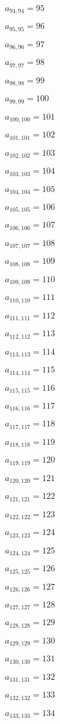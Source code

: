 \documentclass[a4paper,12pt]{article}
\begin{document}
$a _{ 94, 94 } = 95$

$a _{ 95, 95 } = 96$

$a _{ 96, 96 } = 97$

$a _{ 97, 97 } = 98$

$a _{ 98, 98 } = 99$

$a _{ 99, 99 } = 100$

$a _{ 100, 100 } = 101$

$a _{ 101, 101 } = 102$

$a _{ 102, 102 } = 103$

$a _{ 103, 103 } = 104$

$a _{ 104, 104 } = 105$

$a _{ 105, 105 } = 106$

$a _{ 106, 106 } = 107$

$a _{ 107, 107 } = 108$

$a _{ 108, 108 } = 109$

$a _{ 109, 109 } = 110$

$a _{ 110, 110 } = 111$

$a _{ 111, 111 } = 112$

$a _{ 112, 112 } = 113$

$a _{ 113, 113 } = 114$

$a _{ 114, 114 } = 115$

$a _{ 115, 115 } = 116$

$a _{ 116, 116 } = 117$

$a _{ 117, 117 } = 118$

$a _{ 118, 118 } = 119$

$a _{ 119, 119 } = 120$

$a _{ 120, 120 } = 121$

$a _{ 121, 121 } = 122$

$a _{ 122, 122 } = 123$

$a _{ 123, 123 } = 124$

$a _{ 124, 124 } = 125$

$a _{ 125, 125 } = 126$

$a _{ 126, 126 } = 127$

$a _{ 127, 127 } = 128$

$a _{ 128, 128 } = 129$

$a _{ 129, 129 } = 130$

$a _{ 130, 130 } = 131$

$a _{ 131, 131 } = 132$

$a _{ 132, 132 } = 133$

$a _{ 133, 133 } = 134$
\end{document}
